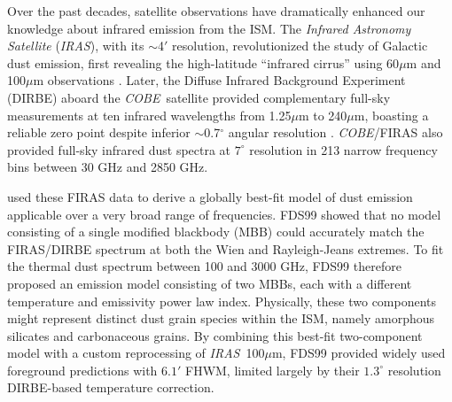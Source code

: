 \documentclass{emulateapj}
\newcommand{\IRAS}{{\it IRAS}}
\newcommand{\COBE}{{\it COBE}}
\begin{document}
Over the past decades, satellite observations have dramatically enhanced our
knowledge about infrared emission from the ISM. The \textit{Infrared Astronomy 
Satellite} (\IRAS), with its $\sim$4$'$ resolution, revolutionized the study of
 Galactic dust emission, first revealing the high-latitude ``infrared cirrus'' 
using 60$\mu$m and 100$\mu$m observations \citep{low84, wheelock94}. Later, the
Diffuse Infrared Background Experiment (DIRBE) aboard the \COBE~satellite 
provided complementary full-sky measurements at ten infrared wavelengths from 
1.25$\mu$m to 240$\mu$m, boasting a reliable zero point despite inferior 
$\sim$0.7$^{\circ}$ angular resolution \citep{boggess92}. \COBE/FIRAS 
\citep{firas} also provided full-sky infrared dust spectra at $7^{\circ}$ 
resolution in 213 narrow frequency bins between 30 GHz and 2850 GHz.


\citet[hereafter FDS99]{FDS99} used these FIRAS data to derive a globally 
best-fit model of dust emission applicable over a very broad range of 
frequencies. FDS99 showed that no model consisting of a single modified 
blackbody (MBB) could accurately match the FIRAS/DIRBE spectrum at both the 
Wien and Rayleigh-Jeans extremes. To fit the thermal dust spectrum between 100 
and 3000 GHz, FDS99 therefore proposed an emission model consisting of two 
MBBs, each with a different temperature and emissivity power law index. 
Physically, these two components might represent distinct dust grain species 
within the ISM, namely amorphous silicates and carbonaceous grains. By 
combining this best-fit two-component model with a custom reprocessing of 
\IRAS~100$\mu$m, FDS99 provided widely used foreground predictions with 
$6.1'$ FHWM, limited largely by their $1.3^{\circ}$ resolution DIRBE-based 
temperature correction.




\end{document}
